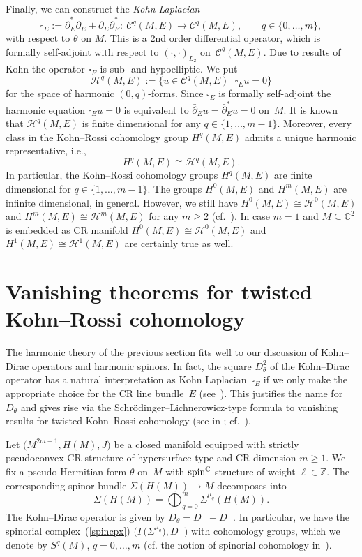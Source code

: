 \documentclass[10pt,a4paper]{amsart}
\numberwithin{equation}{section}
\newcommand{\ZZ}{\mathbb{Z}}
\newcommand{\CC}{\mathbb{C}}
\begin{document}
Finally, we can construct the {\em Kohn Laplacian}
\[
\square_E := \bar{\partial}^*_E\bar{\partial}_E+ \bar{\partial}_E\bar{\partial}^*_E\colon \ \mathcal{C}^{q}(M,E) \to \mathcal{C}^{q}(M,E),\qquad q\in\{0,\dots,m\},
\]
with respect to $\theta$ on $M$.
This is a $2$nd order differential operator, which is formally self-adjoint with respect to $(\cdot,\cdot)_{L_2}$ on~$\mathcal{C}^{q}(M,E)$.
Due to results of Kohn the operator $\square_E$ is sub- and hypoelliptic.
We put
\[
\mathcal{H}^q(M,E) := \big\{u\in\mathcal{C}^q(M,E)\,|\, \square_Eu=0\big\}
\]
for the space of harmonic $(0,q)$-forms. Since $\square_E$ is formally self-adjoint the harmonic equation $\square_Eu=0$ is equivalent to
$\bar{\partial}_Eu=\bar{\partial}^*_Eu=0$ on~$M$.
It is known that $\mathcal{H}^q(M,E)$ is finite dimensional for any $q\in\{1,\dots,m-1\}$. Moreover,
every class in the Kohn--Rossi cohomology group $H^q(M,E)$ admits a unique harmonic representative, i.e.,
\[
H^q(M,E) \cong \mathcal{H}^q(M,E).
\]
In particular, the Kohn--Rossi cohomology groups $H^q(M,E)$ are finite dimensional for $q\in\{1,\dots,m-1\}$. The
groups $H^0(M,E)$ and $H^m(M,E)$ are infinite dimensional, in general. However, we still have
$H^0(M,E)\cong \mathcal{H}^0(M,E)$ and $H^m(M,E) \cong \mathcal{H}^m(M,E)$ for any $m\geq 2$ (cf.~\cite{Tan}).
In case $m=1$ and $M\subseteq\CC^2$ is embedded as CR manifold $H^0(M,E) \cong \mathcal{H}^0(M,E)$ and $H^1(M,E) \cong \mathcal{H}^1(M,E)$ are certainly true as well.

\section{Vanishing theorems for twisted Kohn--Rossi cohomology} \label{Sec10}

The harmonic theory of the previous section fits well to our discussion of Kohn--Dirac operators and harmonic spinors.
In fact, the square $D_\theta^2$ of the Kohn--Dirac operator has a natural interpretation as
Kohn Laplacian~$\square_E$ if we only make the appropriate choice for the CR line bundle~$E$ (see~\cite{Pet}). This justifies the name for $D_\theta$
and gives rise via the Schr\"odinger--Lichnerowicz-type formula to vanishing results for twisted Kohn--Rossi cohomology (see in \cite[Section~II, \S~7]{Tan}; cf.~\cite{Lee}).

Let $\big(M^{2m+1}, H(M), J\big)$ be a closed manifold equipped with strictly pseudoconvex CR structure of hypersurface type and CR dimension $m\geq 1$.
We fix a pseudo-Hermitian form $\theta$ on~$M$ with ${\rm spin}^\CC$ structure of weight $\ell\in\ZZ$.
The corresponding spinor bundle $\Sigma(H(M))\to M$ decomposes into
\[%
\Sigma(H(M)) = \bigoplus_{q=0}^m \Sigma^{\mu_q}(H(M)).
\]
The Kohn--Dirac operator is given by $D_\theta=D_++D_-$. In particular, we have the spinorial complex~(\ref{spincpx}) $\big(\Gamma\big(\Sigma^{\mu_q}\big),D_+\big)$
with cohomology groups, which we denote by $S^q(M)$, $q=0,\dots, m$ (cf. the notion of spinorial cohomology in~\cite{Mic}).
\end{document}
